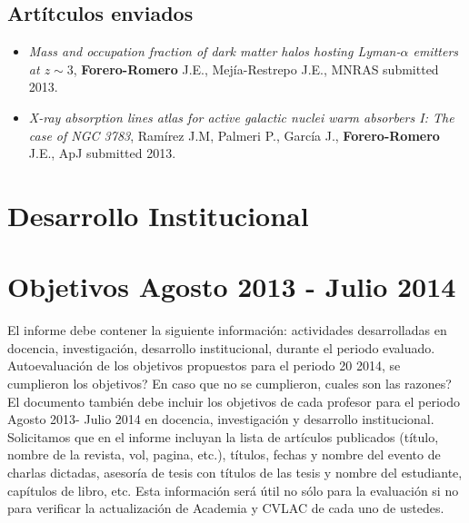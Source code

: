 \documentclass{article}
\begin{document}
\subsection*{Art\'itculos enviados}

\begin{itemize}
\item {\it Mass and occupation fraction of dark matter halos hosting Lyman-$\alpha$
  emitters at $z\sim 3$}, {\bf Forero-Romero} J.E., Mej\'ia-Restrepo
  J.E., MNRAS submitted 2013.
\item {\it X-ray absorption lines atlas for active galactic nuclei
  warm absorbers I: The case of NGC 3783}, Ram\'irez  J.M, Palmeri P.,
  Garc\'ia J., {\bf Forero-Romero} J.E., ApJ submitted 2013.
\end{itemize}


\section*{Desarrollo Institucional}


\section*{Objetivos Agosto 2013 - Julio 2014}
El informe debe contener la siguiente información: actividades desarrolladas en docencia, 
investigación, desarrollo institucional, durante el periodo evaluado.  Autoevaluación de los objetivos 
propuestos para el periodo 20 2014, se cumplieron los objetivos? En caso que no se cumplieron, 
cuales son las razones? El documento también debe incluir los objetivos de cada profesor para el 
periodo Agosto 2013- Julio 2014 en docencia, investigación y desarrollo institucional. Solicitamos que 
en el informe incluyan la lista de artículos publicados (título, nombre de la revista, vol, pagina, 
etc.), títulos, fechas y nombre del evento de charlas dictadas, asesoría de tesis con títulos de las 
tesis y nombre del estudiante, capítulos de libro, etc. Esta información será útil no sólo para la 
evaluación si no para verificar la actualización de Academia y CVLAC de cada uno de ustedes.
\end{document}
